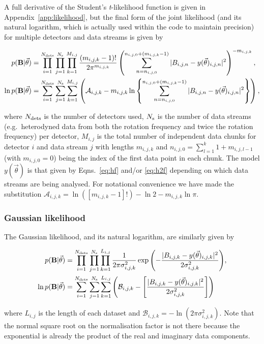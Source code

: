 A full derivative of the Student's {\it t}-likelihood function \citep[see e.g.][]{2005PhRvD..72j2002D} is given
in Appendix~\ref{app:likelihood}, but the final form of the joint likelihood (and its natural logarithm,
which is actually used within the code to maintain precision) for multiple detectors and data streams is
given by
\begin{widetext}
\begin{align}\label{eq:stlikelihood}
p(\mathbf{B}|\vec{\theta}) &= \prod_{i=1}^{N_{\rm dets}} \prod_{j=1}^{N_{\rm s}} \prod_{k=1}^{M_{i,j}}
\frac{(m_{i,j,k}-1)!}{2\pi^{m_{i,j,k}}}
\left(\sum_{n=n_{i,j,0}}^{n_{i,j,0}+(m_{i,j,k}-1)} |B_{i,j,n}-y(\vec{\theta})_{i,j,n}|^2\right)^{-m_{i,j,k}},
\nonumber \\
\ln{p(\mathbf{B}|\vec{\theta})} &= \sum_{i=1}^{N_{\rm dets}} \sum_{j=1}^{N_{\rm s}}
\sum_{k=1}^{M_{i,j}} \left( \mathcal{A}_{i,j,k} - m_{i,j,k}\ln{
\left\{\sum_{n=n_{i,j,0}}^{n_{i,j,0}+(m_{i,j,k}-1)} |B_{i,j,n}-y(\vec{\theta})_{i,j,n}|^2\right\}}
\right),
\end{align}
\end{widetext}
where $N_{\rm dets}$ is the number of detectors used, $N_{\rm s}$ is the number of data streams (e.g.\
heterodyned data from both the rotation frequency and twice the rotation frequency) per detector, $M_{i,j}$ is
the total number of independent data chunks for detector $i$ and data stream $j$ with lengths $m_{i,j,k}$ and
$n_{i,j,0} = \sum_{l=1}^{k} 1+m_{i,j,l-1}$ (with $m_{i,j,0} = 0$) being the index of the first data point in
each chunk. The model $y(\vec{\theta})$ is that given by Eqns.~\ref{eq:hf} and/or \ref{eq:h2f}
depending on which data streams are being analysed. For notational convenience we have made the substitution
$\mathcal{A}_{i,j,k} = \ln{\left([m_{i,j,k}-1]!\right)} - \ln{2} - m_{i,j,k}\ln{\pi}$.

\subsubsection{Gaussian likelihood}

The Gaussian likelihood, and its natural logarithm, are similarly given by
\begin{widetext}
\begin{align}\label{eq:gausslikelihood}
p(\mathbf{B}|\vec{\theta}) &= \prod_{i=1}^{N_{\rm dets}} \prod_{j=1}^{N_{\rm s}} \prod_{k=1}^{L_{i,j}}
\frac{1}{2\pi\sigma_{i,j,k}^2}\exp{\left(-\frac{|B_{i,j,k}-y(\vec{\theta})_{i,j,k}|^2}{2\sigma_{i,j,k}^2}
\right)}, \nonumber \\
\ln{p(\mathbf{B}|\vec{\theta})} &= \sum_{i=1}^{N_{\rm dets}} \sum_{j=1}^{N_{\rm s}}
\sum_{k=1}^{L_{i,j}} \left(\mathcal{B}_{i,j,k} -
\left[\frac{|B_{i,j,k}-y(\vec{\theta})_{i,j,k}|^2}{2\sigma_{i,j,k}^2 } \right] \right)
\end{align}
\end{widetext}
where $L_{i,j}$ is the length of each dataset and $\mathcal{B}_{i,j,k} = -\ln{(2\pi\sigma_{i,j,k}^2)}$. Note
that the normal square root on the normalisation factor is not there because the exponential is already the
product of the real and imaginary data components.

